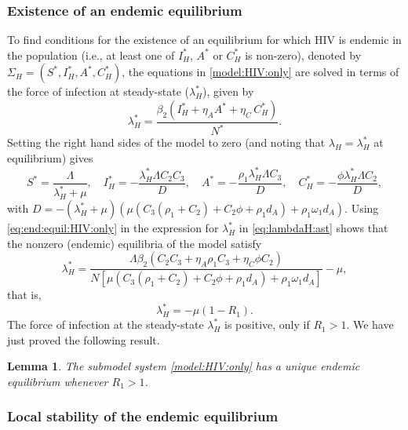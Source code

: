 \documentclass{my_aims}
\newtheorem{lemma}[theorem]{Lemma}
\theoremstyle{definition}
\begin{document}
\subsubsection{Existence of an endemic equilibrium}

To find conditions for the existence of an equilibrium for which HIV is endemic
in the population (i.e., at least one of $I_H^*$, $A^*$ or $C_H^*$ is non-zero),
denoted by $\Sigma_H = \left(S^*, I_H^*, A^*, C_H^* \right)$, the equations
in \eqref{model:HIV:only} are solved in terms of the force of infection
at steady-state ($\lambda_H^*$), given by
\begin{equation}
\label{eq:lambdaH:ast}
\lambda_H^* = \frac{\beta_2 \left( I_H^* + \eta_A A^* + \eta_C \, C_H^* \right)}{N^*}.
\end{equation}
Setting the right hand sides of the model to zero (and noting that
$\lambda_H = \lambda_H^*$ at equilibrium) gives
\begin{equation}
\label{eq:end:equil:HIV:only}
S^* = \frac{\Lambda}{\lambda_H^* + \mu}, \quad I_H^*
=-\frac{\lambda_H^* \Lambda C_2 C_3}{D}, \quad A^*
= -\frac{\rho_1 \lambda_H^* \Lambda C_3}{D}, \quad C_H^*
=- \frac{\phi \lambda_H^* \Lambda C_2}{D},
\end{equation}
with
$D = -(\lambda_H^* + \mu)(\mu \left(C_3(\rho_1 + C_2)
+ C_2 \phi + \rho_1 d_A \right) + \rho_1 \omega_1 d_A)$.
Using \eqref{eq:end:equil:HIV:only} in the expression
for $\lambda_H^*$ in \eqref{eq:lambdaH:ast} shows that
the nonzero (endemic) equilibria of the model satisfy
\begin{equation*}
\lambda_H^* = \frac{\Lambda \beta_2 \left(C_2 C_3 + \eta_A \rho_1 C_3
+ \eta_C \phi C_2\right)}{N \left[ \mu \left(C_3(\rho_1 + C_2)
+ C_2 \phi + \rho_1 d_A \right) + \rho_1 \omega_1 d_A  \right]}-\mu,
\end{equation*}
that is,
\begin{equation*}
\lambda_H^* = -\mu (1-R_1).
\end{equation*}
The force of infection at the steady-state $\lambda_H^*$ is positive,
only if $R_1 > 1$. We have just proved the following result.

\begin{lemma}
The submodel system \eqref{model:HIV:only} has
a unique endemic equilibrium whenever $R_1 > 1$.
\end{lemma}

\subsubsection{Local stability of the endemic equilibrium}
\end{document}
